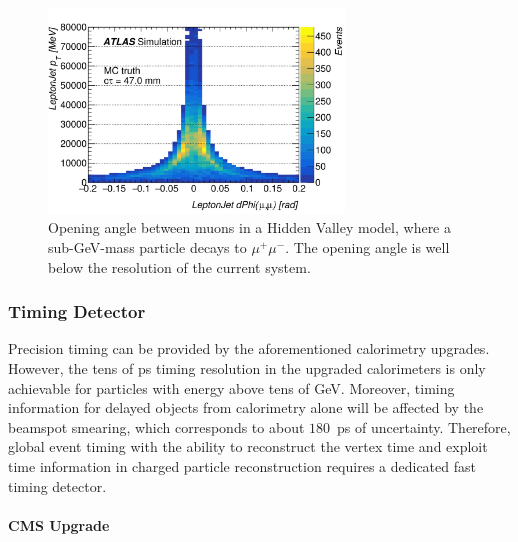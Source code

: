 \begin{figure}[t]
\begin{center}
  \includegraphics[width=0.7\textwidth]{figures/fig_016_anglemuons.png} 
  \caption{Opening angle between muons in a Hidden Valley model, where a sub-GeV-mass particle decays to $\mu^+\mu^-$. The opening angle is well below the resolution of the current system. }
  \label{fig:anglemuons}
\end{center}
\end{figure}

\subsubsection{Timing Detector} \label{sec:upgradetiming}

Precision timing can be provided by the aforementioned calorimetry upgrades. However, the tens of ps timing resolution in the upgraded calorimeters is only achievable for particles with energy above tens of GeV. Moreover, timing information for delayed objects from calorimetry alone will be affected by the beamspot smearing, which corresponds to about $180$~ps of uncertainty. Therefore, global event timing with the ability to reconstruct the vertex time and exploit time information in charged particle reconstruction requires a dedicated fast timing detector.

\paragraph{CMS Upgrade}

